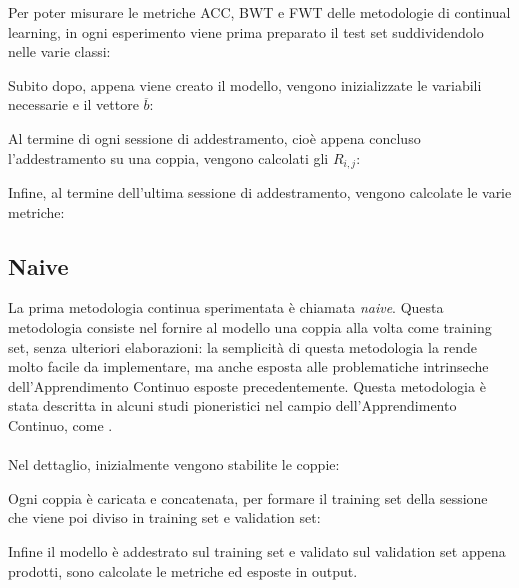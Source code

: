 Per poter misurare le metriche ACC, BWT e FWT delle metodologie di continual learning, in ogni esperimento viene prima preparato il test set suddividendolo nelle varie classi:


Subito dopo, appena viene creato il modello, vengono inizializzate le variabili necessarie e il vettore $\overline{b}$:

Al termine di ogni sessione di addestramento, cioè appena concluso l'addestramento su una coppia, vengono calcolati gli $R_{i,j}$:

Infine, al termine dell'ultima sessione di addestramento, vengono calcolate le varie metriche:


\subsection{Naive}
La prima metodologia continua sperimentata è chiamata \textit{naive}. Questa metodologia consiste nel fornire al modello una coppia alla volta come training set, senza ulteriori elaborazioni: la semplicità di questa metodologia la rende molto facile da implementare, ma anche esposta alle problematiche intrinseche dell'Apprendimento Continuo esposte precedentemente. Questa metodologia è stata descritta in alcuni studi pioneristici nel campio dell'Apprendimento Continuo, come \cite{Ring2004CHILDAF}.\\\\
Nel dettaglio, inizialmente vengono stabilite le coppie:

Ogni coppia è caricata e concatenata, per formare il training set della sessione che viene poi diviso in training set e validation set:



Infine il modello è addestrato sul training set e validato sul validation set appena prodotti, sono calcolate le metriche ed esposte in output.
